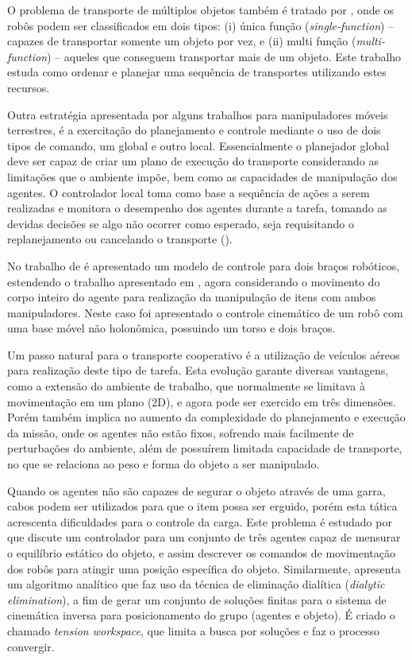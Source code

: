 O problema de transporte de múltiplos objetos também é tratado por \cite{Inoue2008, Inoue2011}, onde os robôs podem ser classificados em dois tipos: (i) única função (\emph{single-function}) -- capazes de transportar somente um objeto por vez, e (ii) multi função (\emph{multi-function}) -- aqueles que conseguem transportar mais de um objeto. Este trabalho estuda como ordenar e planejar uma sequência de transportes utilizando estes recursos.

Outra estratégia apresentada por alguns trabalhos para manipuladores móveis terrestres, é a exercitação do planejamento e controle mediante o uso de dois tipos de comando, um global e outro local. Essencialmente o planejador global deve ser capaz de criar um plano de execução do transporte considerando as limitações que o ambiente impõe, bem como as capacidades de manipulação dos agentes. O controlador local toma como base a sequência de ações a serem realizadas e monitora o desempenho dos agentes durante a tarefa, tomando as devidas decisões se algo não ocorrer como esperado, seja requisitando o replanejamento ou cancelando o transporte (\cite{Yamashita2003, Hekmatfar2014}).

No trabalho de \cite{Adorno2011} é apresentado um modelo de controle para dois braços robóticos, estendendo o trabalho apresentado em \cite{Adorno2010}, agora considerando o movimento do corpo inteiro do agente para realização da manipulação de itens com ambos manipuladores. Neste caso foi apresentado o controle cinemático de um robô com uma base móvel não holonômica, possuindo um torso e dois braços.

Um passo natural para o transporte cooperativo é a utilização de veículos aéreos para realização deste tipo de tarefa. Esta evolução garante diversas vantagens, como a extensão do ambiente de trabalho, que normalmente se limitava à movimentação em um plano (2D), e agora pode ser exercido em três dimensões. Porém também implica no aumento da complexidade do planejamento e execução da missão, onde os agentes não estão fixos, sofrendo mais facilmente de perturbações do ambiente, além de possuírem limitada capacidade de transporte, no que se relaciona ao peso e forma do objeto a ser manipulado.

Quando os agentes não são capazes de segurar o objeto através de uma garra, cabos podem ser utilizados para que o item possa ser erguido, porém esta tática acrescenta dificuldades para o controle da carga. Este problema é estudado por \cite{Michael2011} que discute um controlador para um conjunto de três agentes capaz de mensurar o equilíbrio estático do objeto, e assim descrever os comandos de movimentação dos robôs para atingir uma posição específica do objeto. Similarmente, \cite{Jiang2013} apresenta um algoritmo analítico que faz uso da técnica de eliminação dialítica (\emph{dialytic elimination}), a fim de gerar um conjunto de soluções finitas para o sistema de cinemática inversa para posicionamento do grupo (agentes e objeto). É criado o chamado \emph{tension workspace}, que limita a busca por soluções e faz o processo convergir.

